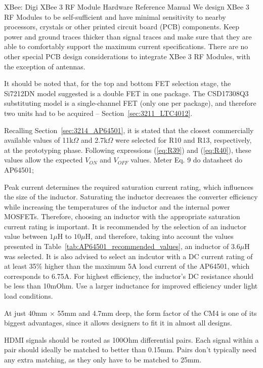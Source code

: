 XBee: Digi XBee 3 RF Module Hardware Reference Manual
We design XBee 3 RF Modules to be self-sufficient and have minimal sensitivity to nearby processors,
crystals or other printed circuit board (PCB) components. Keep power and ground traces thicker than
signal traces and make sure that they are able to comfortably support the maximum current
specifications. There are no other special PCB design considerations to integrate XBee 3 RF Modules,
with the exception of antennas.




It should be noted that, for the top and bottom FET selection stage, the Si7212DN model suggested is a double FET in one package. The CSD17308Q3 substituting model is a single-channel FET (only one per package), and therefore two units had to be acquired -- Section~\ref{sec:3211_LTC4012}.

Recalling Section~\ref{sec:3214_AP64501}, it is stated that the closest commercially available values of 11k$\Omega$ and 2.7k$\Omega$ were selected for R10 and R13, respectively, at the prototyping phase. Following expressions (\ref{eq:R39}) and (\ref{eq:R40}), these values allow the expected $V_{ON}$ and $V_{OFF}$ values.
    Meter Eq. 9 do datasheet do AP64501;
    
    Peak current determines the required saturation current rating, which influences the size of the inductor. Saturating the inductor decreases the converter efficiency while increasing the temperatures of the inductor and the internal power MOSFETs. Therefore, choosing an inductor with the appropriate saturation current rating is important. 
    It is recommended by \cite{AP64501} the selection of an inductor value between $1 \mu$H to $10 \mu$H, and therefore, taking into account the values presented in Table~\ref{tab:AP64501_recommended_values}, an inductor of $3.6 \mu$H was selected. It is also advised to select an indcutor with a DC current rating of at least 35\% higher than the maximum 5A load current of the AP64501, which corresponds to 6.75A.
    For highest efficiency, the inductor's DC resistance should be less than 10mOhm. Use a larger inductance for improved efficiency under light load conditions.


    At just 40mm $\times$ 55mm and 4.7mm deep, the form factor of the CM4 is one of its biggest advantages, since it allows designers to fit it in almost all designs.

    HDMI signals should be routed as 100Ohm differential pairs. Each signal within a pair should ideally be matched to better than 0.15mm. Pairs don't typically need any extra matching, as they only have to be matched to 25mm.

